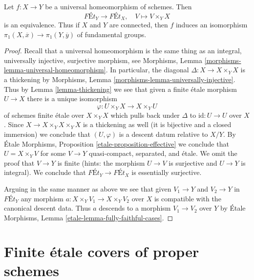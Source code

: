 \begin{proposition}
\label{proposition-universal-homeomorphism}
Let $f : X \to Y$ be a universal homeomorphism of schemes. Then
$$
\textit{F\'Et}_Y \longrightarrow \textit{F\'Et}_X,\quad
V \longmapsto V \times_Y X
$$
is an equivalence. Thus if $X$ and $Y$ are connected, then
$f$ induces an isomorphism $\pi_1(X, \overline{x}) \to \pi_1(Y, \overline{y})$
of fundamental groups.
\end{proposition}

\begin{proof}
Recall that a universal homeomorphism is the same thing as an
integral, universally injective, surjective morphism, see
Morphisms, Lemma \ref{morphisms-lemma-universal-homeomorphism}.
In particular, the diagonal $\Delta : X \to X \times_Y X$ is a thickening
by Morphisms, Lemma \ref{morphisms-lemma-universally-injective}.
Thus by Lemma \ref{lemma-thickening}
we see that given a finite \'etale morphism $U \to X$
there is a unique isomorphism
$$
\varphi : U \times_Y X \to X \times_Y U
$$
of schemes finite \'etale over $X \times_Y X$ which pulls back under
$\Delta$ to $\text{id} : U \to U$ over $X$.
Since $X \to X \times_Y X \times_Y X$
is a thickening as well (it is bijective and a closed immersion)
we conclude that $(U, \varphi)$ is a descent datum relative to $X/Y$.
By \'Etale Morphisms, Proposition \ref{etale-proposition-effective}
we conclude that $U = X \times_Y V$ for some $V \to Y$
quasi-compact, separated, and \'etale.
We omit the proof that $V \to Y$ is finite (hints:
the morphism $U \to V$ is surjective and $U \to Y$ is integral).
We conclude that $\textit{F\'Et}_Y \to \textit{F\'Et}_X$
is essentially surjective.

\medskip\noindent
Arguing in the same manner as above we see that given
$V_1 \to Y$ and $V_2 \to Y$ in $\textit{F\'Et}_Y$ any
morphism $a : X \times_Y V_1 \to X \times_Y V_2$ over $X$
is compatible with the canonical descent data. Thus $a$
descends to a morphism $V_1 \to V_2$ over $Y$ by
\'Etale Morphisms, Lemma \ref{etale-lemma-fully-faithful-cases}.
\end{proof}










\section{Finite \'etale covers of proper schemes}
\label{section-finite-etale-over-proper}

